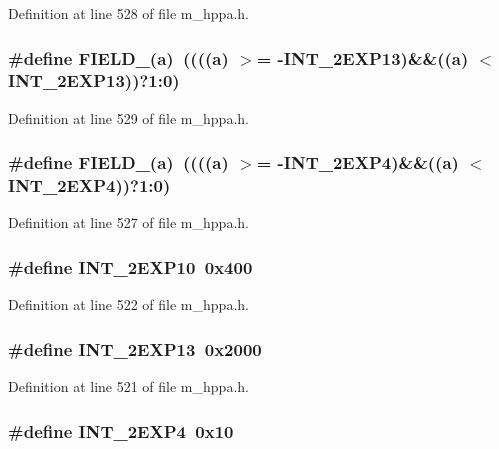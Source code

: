 Definition at line 528 of file m\_\-hppa.h.
\subsubsection{\setlength{\rightskip}{0pt plus 5cm}\#define FIELD\_(a)~((((a) $>$= -INT\_\-2EXP13)\&\&((a) $<$ INT\_\-2EXP13))?1:0)}\label{m__hppa_8h_cc6a0eb7724b0802cbd69ae9acf6082b}




Definition at line 529 of file m\_\-hppa.h.
\subsubsection{\setlength{\rightskip}{0pt plus 5cm}\#define FIELD\_(a)~((((a) $>$= -INT\_\-2EXP4)\&\&((a) $<$ INT\_\-2EXP4))?1:0)}\label{m__hppa_8h_fccd4f0351ce74077ec3a4453fc78a78}




Definition at line 527 of file m\_\-hppa.h.
\subsubsection{\setlength{\rightskip}{0pt plus 5cm}\#define INT\_\-2EXP10~0x400}\label{m__hppa_8h_651faa72c9b7f15c045f3331409244fd}




Definition at line 522 of file m\_\-hppa.h.
\subsubsection{\setlength{\rightskip}{0pt plus 5cm}\#define INT\_\-2EXP13~0x2000}\label{m__hppa_8h_d54f85a1243ada4cb7c81d57efa1e094}




Definition at line 521 of file m\_\-hppa.h.
\subsubsection{\setlength{\rightskip}{0pt plus 5cm}\#define INT\_\-2EXP4~0x10}\label{m__hppa_8h_0529ef9c1bae004b6dd773989e2715ca}




